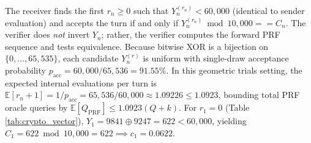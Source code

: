 \documentclass[9pt,a4paper]{extarticle}
\begin{document}
The receiver finds the first $r_n \ge 0$ such that $Y_n^{(r_n)} < 60{,}000$ (identical to sender evaluation) and accepts the turn if and only if $Y_n^{(r_n)} \bmod 10{,}000 == C_n$. The verifier does \emph{not} invert $Y_n$; rather, the verifier computes the forward PRF sequence and tests equivalence. Because bitwise XOR is a bijection on $\{0, \dots, 65{,}535\}$, each candidate $Y_n^{(r)}$ is uniform with single-draw acceptance probability $p_{\text{acc}} = 60{,}000/65{,}536 = 91.55\%$. In this geometric trials setting, the expected internal evaluations per turn is $\mathbb{E}[r_n+1] = 1/p_{\text{acc}} = 65{,}536/60{,}000 \approx 1.09226 \le 1.0923$, bounding total PRF oracle queries by $\mathbb{E}[Q_{\text{PRF}}] \le 1.0923(Q+k)$. For $r_1=0$ (Table \ref{tab:crypto_vector}), $Y_1 = 9841 \oplus 9247 = 622 < 60{,}000$, yielding $C_1 = 622 \bmod 10{,}000 = 622 \implies c_1 = 0.0622$.
\end{document}
